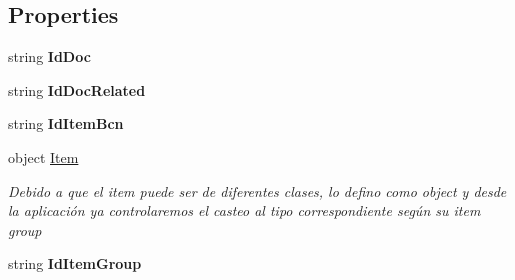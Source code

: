 \subsection*{Properties}
\begin{DoxyCompactItemize}
\item 
\mbox{\label{class_h_k_supply_1_1_models_1_1_supply_1_1_packing_list_item_batch_ab555b71d5d3fa612cc6d0d6adbb716a2}} 
string {\bfseries Id\+Doc}
\item 
\mbox{\label{class_h_k_supply_1_1_models_1_1_supply_1_1_packing_list_item_batch_a0e1bf06eee24e0e78143261b8236c757}} 
string {\bfseries Id\+Doc\+Related}
\item 
\mbox{\label{class_h_k_supply_1_1_models_1_1_supply_1_1_packing_list_item_batch_a9d6013b20d22563cba2f039af2e9e339}} 
string {\bfseries Id\+Item\+Bcn}
\item 
object \mbox{\hyperlink{class_h_k_supply_1_1_models_1_1_supply_1_1_packing_list_item_batch_a772eacdcacf8943effe8b183466553a1}{Item}}
\begin{DoxyCompactList}\small\item\em Debido a que el item puede ser de diferentes clases, lo defino como object y desde la aplicación ya controlaremos el casteo al tipo correspondiente según su item group \end{DoxyCompactList}\item 
\mbox{\label{class_h_k_supply_1_1_models_1_1_supply_1_1_packing_list_item_batch_ab358cde8bb0a9dcc7a998d3322fccbdb}} 
string {\bfseries Id\+Item\+Group}
\item 
\mbox{\label{class_h_k_supply_1_1_models_1_1_supply_1_1_packing_list_item_batch_ad88dcd6dfff227043ece4fc629ce997a}} 

\end{DoxyCompactItemize}
